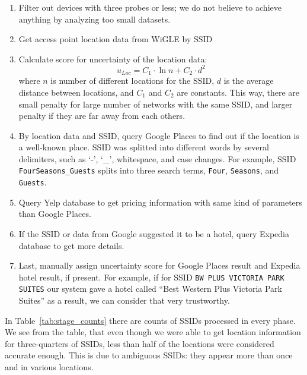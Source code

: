 \documentclass[12pt,a4paper,oneside,pdftex]{report}
\begin{document}
\begin{enumerate}
    \item Filter out devices with three probes or less; we do not believe to achieve anything by analyzing too small datasets.

    \item Get access point location data from WiGLE by SSID
    
    \item Calculate score for uncertainty of the location data:
        $$ u_{Loc} = C_1 \cdot \ln n + C_2 \cdot d^2 $$
        where $n$ is number of different locations for the SSID, $d$ is the average distance between locations, and $C_1$ and $C_2$ are constants. This way, there are small penalty for large number of networks with the same SSID, and larger penalty if they are far away from each others.
    
    \item By location data and SSID, query Google Places to find out if the location is a well-known place. SSID was splitted into different words by several delimiters, such as `-', `\_', whitespace, and case changes. For example, SSID \texttt{FourSeasons\_Guests} splits into three search terms, \texttt{Four}, \texttt{Seasons}, and \texttt{Guests}.

    \item Query Yelp database to get pricing information with same kind of parameters than Google Places.

    \item If the SSID or data from Google suggested it to be a hotel, query Expedia database to get more details.

    \item Last, manually assign uncertainty score for Google Places result and Expedia hotel result, if present. For example, if for SSID \texttt{BW PLUS VICTORIA PARK SUITES} our system gave a hotel called ``Best Western Plus Victoria Park Suites'' as a result, we can consider that very trustworthy.
\end{enumerate}

In Table~\ref{tab:stage_counts} there are counts of SSIDs processed in every phase. We see from the table, that even though we were able to get location information for three-quarters of SSIDs, less than half of the locations were considered accurate enough. This is due to ambiguous SSIDs: they appear more than once and in various locations.
\end{document}
